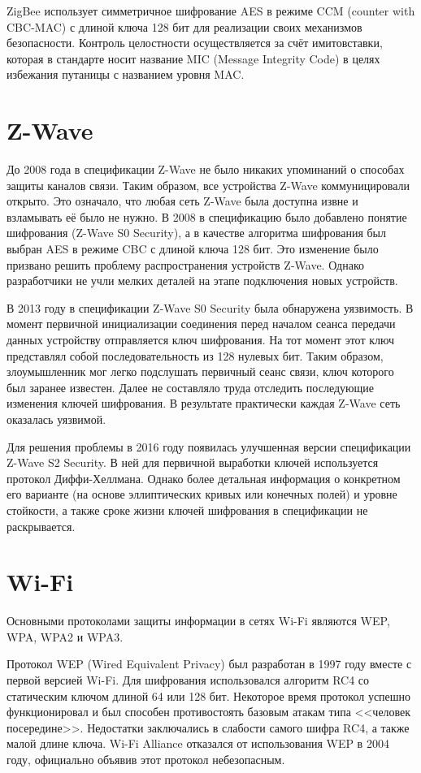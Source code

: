 	ZigBee использует симметричное шифрование AES в режиме CCM (counter with CBC-MAC) с длиной ключа 128 бит для 
	реализации своих механизмов безопасности. Контроль целостности осуществляется за счёт имитовставки, которая 
	в стандарте носит название MIC (Message Integrity Code) в целях избежания путаницы с названием уровня MAC.

	
	\section{Z-Wave}
	
	До 2008 года в спецификации Z-Wave не было никаких упоминаний о способах защиты каналов связи. 
	Таким образом, все устройства Z-Wave коммуницировали открыто. Это означало, что любая сеть Z-Wave 
	была доступна извне и взламывать её было не нужно. В 2008 в спецификацию было добавлено понятие 
	шифрования (Z-Wave S0 Security), а в качестве алгоритма шифрования был выбран AES 
	в режиме CBC с длиной ключа 128 бит. 
	Это изменение было призвано решить проблему распространения устройств Z-Wave. Однако разработчики
	не учли мелких деталей на этапе подключения новых устройств.
	
	В 2013 году в спецификации  Z-Wave S0 Security была обнаружена уязвимость. В момент первичной 
	инициализации соединения перед началом сеанса передачи данных устройству отправляется ключ шифрования.
	На тот момент этот ключ представлял собой последовательность из 128 нулевых бит. Таким образом, злоумышленник
	мог легко подслушать первичный сеанс связи, ключ которого был заранее известен. Далее не
	составляло труда отследить последующие изменения ключей шифрования. В результате практически
	каждая Z-Wave сеть оказалась уязвимой.
	
	Для решения проблемы в 2016 году
	появилась улучшенная версии спецификации Z-Wave S2 Security. В ней для первичной выработки ключей
	используется протокол Диффи-Хеллмана. Однако более детальная информация о конкретном его варианте
	(на основе эллиптических кривых или конечных полей) и уровне стойкости, а также сроке жизни ключей
	шифрования в спецификации не раскрывается.
	
	
	\section{Wi-Fi}
	
	Основными протоколами защиты информации в сетях Wi-Fi являются WEP, WPA, WPA2 и WPA3.
	
	Протокол WEP (Wired Equivalent Privacy) был разработан в 1997 году вместе с первой версией Wi-Fi.
	Для шифрования использовался алгоритм RC4 со статическим ключом длиной 64 или 128 бит. Некоторое время
	протокол успешно функционировал и был способен противостоять базовым атакам типа <<человек посередине>>.
	Недостатки заключались в слабости самого шифра RC4, а также малой длине ключа. Wi-Fi Alliance отказался 
	от использования WEP в 2004 году, официально объявив этот протокол небезопасным.
	

